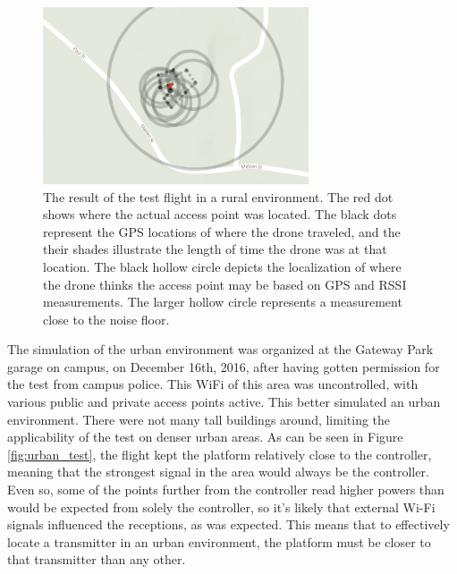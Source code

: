 \begin{figure}[ht!]
	\centering
	\includegraphics[width=0.70\textwidth]{img/ruraltest.png}
	\caption{The result of the test flight in a rural environment. The red dot shows where the actual access point was located. The black dots represent the GPS locations of where the drone traveled, and the their shades illustrate the length of time the drone was at that location. The black hollow circle depicts the localization of where the drone thinks the access point may be based on GPS and RSSI measurements. The larger hollow circle represents a measurement close to the noise floor.}
	\label{fig:rural_test}
\end{figure} \par
The simulation of the urban environment was organized at the Gateway Park garage on campus, on December 16th, 2016, after having gotten permission for the test from campus police. This WiFi of this area was uncontrolled, with various public and private access points active. This better simulated an urban environment. There were not many tall buildings around, limiting the applicability of the test on denser urban areas. As can be seen in Figure \ref{fig:urban_test}, the flight kept the platform relatively close to the controller, meaning that the strongest signal in the area would always be the controller. Even so, some of the points further from the controller read higher powers than would be expected from solely the controller, so it's likely that external Wi-Fi signals influenced the receptions, as was expected. This means that to effectively locate a transmitter in an urban environment, the platform must be closer to that transmitter than any other.
